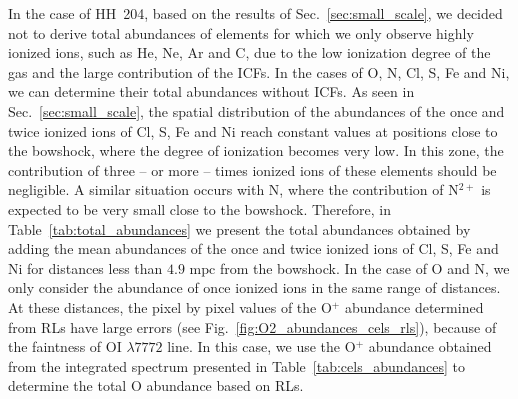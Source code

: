 \documentclass[twocolumn,linenumbers]{aastex63}
\begin{document}
In the case of HH~204, based on the results of Sec.~\ref{sec:small_scale}, we decided not to derive total abundances of elements for which we only observe highly ionized ions, such as He, Ne, Ar and C, due to the low ionization degree of the gas and the large contribution of the ICFs. In the cases of O, N, Cl, S, Fe and Ni, we can determine their total abundances without ICFs. %
As seen in Sec.~\ref{sec:small_scale}, the spatial distribution of the abundances of the once and twice ionized ions of Cl, S, Fe and Ni reach constant values at positions close to the bowshock, where the degree of ionization becomes very low. In this zone, the contribution of three -- or more -- times ionized ions of these elements should be negligible. A similar situation occurs with N, where the contribution of N$^{2+}$ is expected to be very small close to the bowshock. Therefore, in Table~\ref{tab:total_abundances} we present the total abundances  obtained by adding the mean abundances of the once and twice ionized ions of Cl, S, Fe and Ni for distances less than $4.9  \text{ mpc}$ from the bowshock. In the case of O and N, we only consider the abundance of once ionized ions in the same range of distances. At these distances, the pixel by pixel values of the O$^{+}$ abundance determined from RLs have large errors (see  Fig.~\ref{fig:O2_abundances_cels_rls}), because of the faintness of O\thinspace I $\lambda 7772$ line. In this case, we use the O$^{+}$ abundance obtained from the integrated spectrum presented in Table~\ref{tab:cels_abundances} to determine the total O abundance based on RLs.
\end{document}
